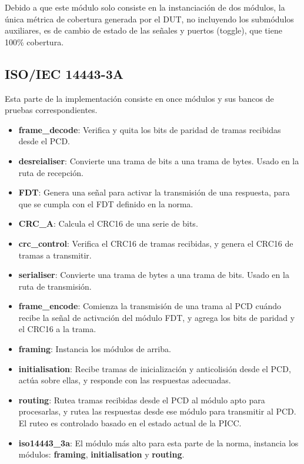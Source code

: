 \documentclass[a4paper, twoside, 11pt]{report}
\begin{document}
Debido a que este módulo solo consiste en la instanciación de dos módulos, la única métrica de cobertura generada por el DUT, no incluyendo los submódulos auxiliares, es de cambio de estado de las señales y puertos (toggle), que tiene 100\% cobertura.

\FloatBarrier
\subsection{ISO/IEC 14443-3A}

Esta parte de la implementación consiste en once módulos y sus bancos de pruebas correspondientes.

\begin{itemize}
  \item \textbf{frame\_decode}: Verifica y quita los bits de paridad de tramas recibidas desde el PCD.
  \item \textbf{desreialiser}: Convierte una trama de bits a una trama de bytes. Usado en la ruta de recepción.
  \item \textbf{FDT}: Genera una señal para activar la transmisión de una respuesta, para que se cumpla con el FDT definido en la norma.
  \item \textbf{CRC\_A}: Calcula el CRC16 de una serie de bits.
  \item \textbf{crc\_control}: Verifica el CRC16 de tramas recibidas, y genera el CRC16 de tramas a transmitir.
  \item \textbf{serialiser}: Convierte una trama de bytes a una trama de bits. Usado en la ruta de transmisión.
  \item \textbf{frame\_encode}: Comienza la transmisión de una trama al PCD cuándo recibe la señal de activación del módulo FDT, y agrega los bits de paridad y el CRC16 a la trama.
  \item \textbf{framing}: Instancia los módulos de arriba.
  \item \textbf{initialisation}: Recibe tramas de inicialización y anticolisión desde el PCD, actúa sobre ellas, y responde con las respuestas adecuadas.
  \item \textbf{routing}: Rutea tramas recibidas desde el PCD al módulo apto para procesarlas, y rutea las respuestas desde ese módulo para transmitir al PCD. El ruteo es controlado basado en el estado actual de la PICC.
  \item \textbf{iso14443\_3a}: El módulo más alto para esta parte de la norma, instancia los módulos: \textbf{framing}, \textbf{initialisation} y \textbf{routing}.
\end{itemize}
\end{document}
